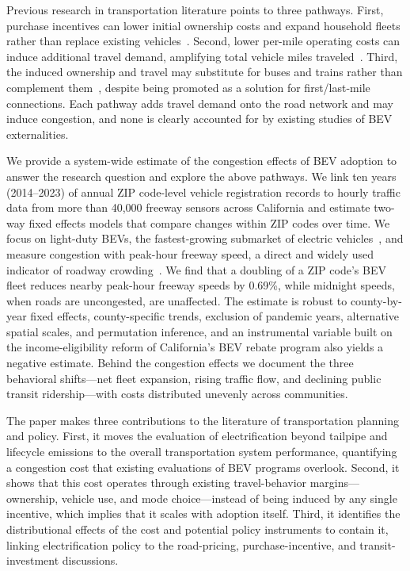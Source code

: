 \documentclass[11pt, letterpaper]{article}
\begin{document}
Previous research in transportation literature points to three pathways.
First, purchase incentives can lower initial ownership costs and expand household fleets rather than replace existing vehicles~\citep{Yang2024,Fevang2021}.
Second, lower per-mile operating costs can induce additional travel demand, amplifying total vehicle miles traveled~\citep{Jia2022}.
Third, the induced ownership and travel may substitute for buses and trains rather than complement them~\citep{Luna2020,Schluter2019,Shaheen2016,Fayez2022}, despite being promoted as a solution for first/last-mile connections.
Each pathway adds travel demand onto the road network and may induce congestion, and none is clearly accounted for by existing studies of BEV externalities.

We provide a system-wide estimate of the congestion effects of BEV adoption to answer the research question and explore the above pathways.
We link ten years (2014--2023) of annual ZIP code-level vehicle registration records to hourly traffic data from more than 40,000 freeway sensors across California and estimate two-way fixed effects models that compare changes within ZIP codes over time.
We focus on light-duty BEVs, the fastest-growing submarket of electric vehicles~\citep{Nordelof2014}, and measure congestion with peak-hour freeway speed, a direct and widely used indicator of roadway crowding~\citep{Rao2012}.
We find that a doubling of a ZIP code's BEV fleet reduces nearby peak-hour freeway speeds by 0.69\%, while midnight speeds, when roads are uncongested, are unaffected.
The estimate is robust to county-by-year fixed effects, county-specific trends, exclusion of pandemic years, alternative spatial scales, and permutation inference, and an instrumental variable built on the income-eligibility reform of California's BEV rebate program also yields a negative estimate.
Behind the congestion effects we document the three behavioral shifts---net fleet expansion, rising traffic flow, and declining public transit ridership---with costs distributed unevenly across communities.

The paper makes three contributions to the literature of transportation planning and policy.
First, it moves the evaluation of electrification beyond tailpipe and lifecycle emissions to the overall transportation system performance, quantifying a congestion cost that existing evaluations of BEV programs overlook.
Second, it shows that this cost operates through existing travel-behavior margins---ownership, vehicle use, and mode choice---instead of being induced by any single incentive, which implies that it scales with adoption itself.
Third, it identifies the distributional effects of the cost and potential policy instruments to contain it, linking electrification policy to the road-pricing, purchase-incentive, and transit-investment discussions.
\end{document}
